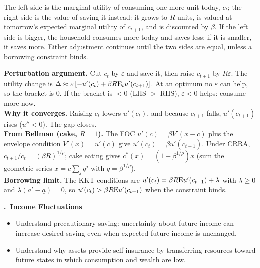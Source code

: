 \documentclass[11pt]{article}
\newcounter{qn}
\newcommand{\question}[1]{\par\needspace{14\baselineskip}\refstepcounter{qn}\medskip
{\bfseries\color{ink}\large \theqn.\ #1}\par\smallskip}
\begin{document}
\begin{resp}
The left side is the marginal utility of consuming one more unit today, $c_t$; the right side is the value of saving it instead: it grows to $R$ units, is valued at tomorrow's expected marginal utility of $c_{t+1}$, and is discounted by $\beta$. If the left side is bigger, the household consumes more today and saves less; if it is smaller, it saves more. Either adjustment continues until the two sides are equal, unless a borrowing constraint binds.
\end{resp}
\begin{intu}
\textbf{Perturbation argument.} Cut $c_t$ by $\varepsilon$ and save it, then raise $c_{t+1}$ by $R\varepsilon$. The utility change is $\Delta\approx\varepsilon\,[-u'(c_t)+\beta R\mathrm{E}_tu'(c_{t+1})]$. At an optimum no $\varepsilon$ can help, so the bracket is $0$. If the bracket is $<0$ (LHS $>$ RHS), $\varepsilon<0$ helps: consume more now.\\
\textbf{Why it converges.} Raising $c_t$ lowers $u'(c_t)$, and because $c_{t+1}$ falls, $u'(c_{t+1})$ rises ($u''<0$). The gap closes.\\
\textbf{From Bellman (cake, $R=1$).} The FOC $u'(c)=\beta V'(x-c)$ plus the envelope condition $V'(x)=u'(c)$ give $u'(c_t)=\beta u'(c_{t+1})$. Under CRRA, $c_{t+1}/c_t=(\beta R)^{1/\rho}$; cake eating gives $c^*(x)=(1-\beta^{1/\rho})x$ (sum the geometric series $x=c\sum_j q^j$ with $q=\beta^{1/\rho}$).\\
\textbf{Borrowing limit.} The KKT conditions are $u'(c_t)=\beta R\mathrm{E} u'(c_{t+1})+\lambda$ with $\lambda\ge0$ and $\lambda(a'-\underline a)=0$, so $u'(c_t)>\beta R\mathrm{E} u'(c_{t+1})$ when the constraint binds.
\end{intu}

\question{Income Fluctuations}
\begin{itemize}[leftmargin=1.2em,itemsep=0pt]\itshape
\item Understand precautionary saving: uncertainty about future income can increase desired saving even when expected future income is unchanged.
\item Understand why assets provide self-insurance by transferring resources toward future states in which consumption and wealth are low.
\end{itemize}
\end{document}
